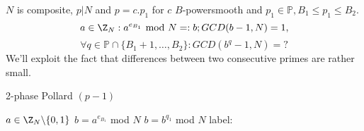 $N$ is composite, $p|N$ and $p=c.p_1$ for $c$ $B$-powersmooth and $p_1 \in \mathbb{P}, B_1\leq p_1\leq B_2$.
\[
	a \in \Z_N: a^{e_{B_1}}\text{ mod }N=:b; GCD(b-1,N)=1,
\]
\[
	\forall q \in \mathbb{P} \cap\{B_1+1,\dots,B_2\}: GCD(b^q-1,N)=?
\]
We'll exploit the fact that differences between two consecutive primes are rather small.

\begin{algorithm}
    \caption{2-phase Pollard $(p-1)$}
	$a\in\Z_N\backslash\{0,1\}$\;
	$b=a^{e_{B_1}}$ mod $N$\;
	$b=b^{q_1}$ mod $N$\;
	label:
    \vspace{0.2cm}
\end{algorithm}


